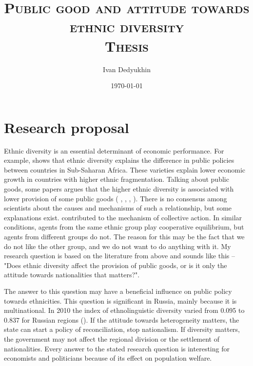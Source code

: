 \documentclass[letterpaper,11pt]{article}
\begin{document}
\title{\textsc{Public good and attitude towards ethnic diversity} \\ \vspace{.5cm} \large \textsc{Thesis}}
\author{Ivan Dedyukhin}
\date{\today}
\maketitle

\section{Research proposal}

Ethnic diversity is an essential determinant of economic performance. For example, \cite{Africa} shows that ethnic diversity explains the difference in public policies between countries in Sub-Saharan Africa. These varieties explain lower economic growth in countries with higher ethnic fragmentation. Talking about public goods, some papers argues that the higher ethnic diversity is associated with lower provision of some public goods ( \cite{AlesinaDivision}, \cite{Kenya}, \cite{Indonesia}, \cite{difference}). There is no consensus among scientists about the causes and mechanisms of such a relationship, but some explanations exist. \cite{WhyUndermine} contributed to the mechanism of collective action. In similar conditions, agents from the same ethnic group play cooperative equilibrium, but agents from different groups do not. The reason for this may be the fact that we do not like the other group, and we do not want to do anything with it. My research question is based on the literature from above and sounds like this -- "Does ethnic diversity affect the provision of public goods, or is it only the attitude towards nationalities that matters?".

The answer to this question may have a beneficial influence on public policy towards ethnicities. This question is significant in Russia, mainly because it is multinational. In 2010 the index of ethnolinguistic diversity varied from 0.095 to 0.837 for Russian regions (\cite{Russia}). If the attitude towards heterogeneity matters, the state can start a policy of reconciliation, stop nationalism. If diversity matters, the government may not affect the regional division or the settlement of nationalities. Every answer to the stated research question is interesting for economists and politicians because of its effect on population welfare. 
\end{document}
